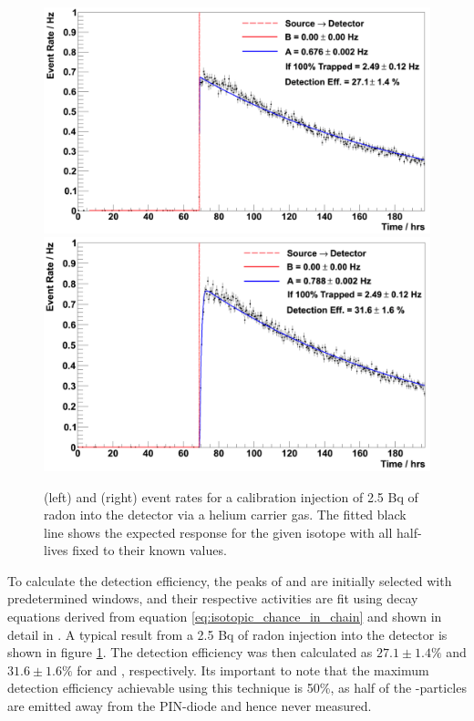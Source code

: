 \begin{figure}[b!]
    \centering
    \includegraphics[scale=0.23]{Chapter_4/Figures/Po_218_Calibration.png}
    \includegraphics[scale=0.23]{Chapter_4/Figures/Po_214_Calibration.png}
    \caption[\PoTOE{} and \PoTOF{} event rates for a calibration injection of 2.5 Bq of radon into the detector via a helium carrier gas.]
    {\PoTOE{} (left) and \PoTOF{} (right) event rates for a calibration injection of 2.5 Bq of radon into the detector via a helium carrier gas. The fitted black line shows the expected response for the given isotope with all half-lives fixed to their known values.}
    \label{fig:calibration_decay_fit}
\end{figure}
%

To calculate the detection efficiency, the peaks of \PoTOE{} and \PoTOF{} are initially selected with predetermined windows, and their respective activities are fit using decay equations derived from equation \ref{eq:isotopic_chance_in_chain} and shown in detail in \cite{mott_2013}. A typical result from a 2.5 Bq of radon injection into the detector is shown in figure \ref{fig:calibration_decay_fit}. The detection efficiency was then calculated as $27.1\pm1.4\%$ and $31.6\pm1.6\%$ for \PoTOE{} and \PoTOF{}, respectively. Its important to note that the maximum detection efficiency achievable using this technique is 50\%, as half of the \alpha{}-particles are emitted away from the PIN-diode and hence never measured. 


